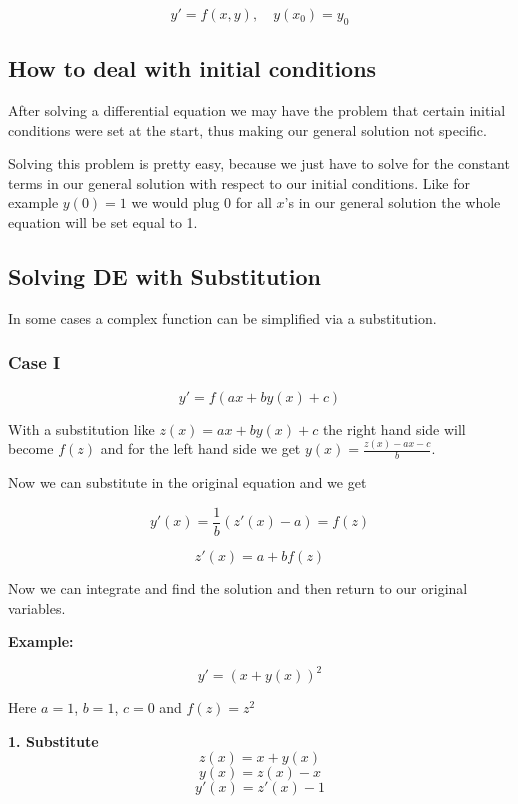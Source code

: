 \[y' = f(x,y), \quad y(x_0) = y_0\]

\subsection{How to deal with initial conditions}

After solving a differential equation we may have the problem that certain initial
conditions were set at the start, thus making our general solution not specific.
\vspace{\baselineskip}

Solving this problem is pretty easy, because we just have to solve for the constant terms
in our general solution with respect to our initial conditions. Like for example \(y(0) = 1\)
we would plug 0 for all \(x\)'s in our general solution the whole equation will be set equal to 1.

\subsection{Solving DE with Substitution}

In some cases a complex function can be simplified via a substitution.

\subsubsection{Case I}

\[y' = f(ax + by(x) + c)\]

With a substitution like \(z(x) = ax + by(x) + c\) the right hand side will become \(f(z)\)
and for the left hand side we get \(y(x) = \frac{z(x) - ax - c}{b}\).
\vspace{\baselineskip}

Now we can substitute in the original equation and we get

\[y'(x) = \frac{1}{b} (z'(x) - a) = f(z)\]

\[z'(x) = a + b f(z)\]

Now we can integrate and find the solution and then return to our original variables.
\vspace{\baselineskip}

\textbf{Example:}

\[y' = (x + y(x))^2\]

Here \(a = 1\), \(b = 1\), \(c = 0\) and \(f(z) = z^2\)
\vspace{\baselineskip}

\textbf{1. Substitute}
\[
z(x) = x + y(x)
\]
\[y(x) = z(x) - x\]
\[y'(x) = z'(x) - 1\]

